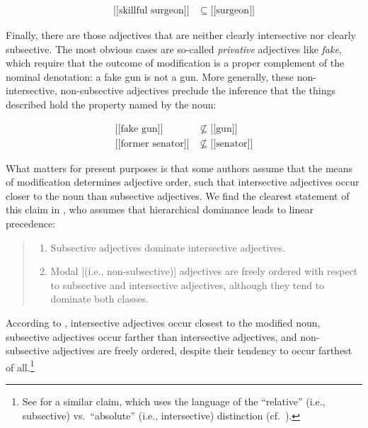 \documentclass[12pt]{article}
\newcommand{\sem}[1]{\mbox{$[\![$#1$]\!]$}}
\newcommand{\ben}{\begin{enumerate}}
\newcommand{\een}{\end{enumerate}}
\begin{document}
\begin{align*} 
\sem{skillful surgeon} & \subseteq \sem{surgeon}
\end{align*}

\noindent Finally, there are those adjectives that are neither clearly intersective nor clearly subsective. The most obvious cases are so-called \emph{privative} adjectives like \emph{fake}, which require that the outcome of modification is a proper complement of the nominal denotation: a fake gun is not a gun.  More generally, these non-intersective, non-subsective adjectives preclude the inference that the things described hold the property named by the noun:

\begin{align*} 
\sem{fake gun} & \nsubseteq \sem{gun}\\
\sem{former senator} & \nsubseteq \sem{senator}
\end{align*}

What matters for present purposes is that some authors assume that the means of modification determines adjective order, such that intersective adjectives occur closer to the noun than subsective adjectives. We find the clearest statement of this claim in \cite{truswell2009}, who assumes that hierarchical dominance leads to linear precedence:

\begin{quotation}
\noindent\ben
	\item Subsective adjectives dominate intersective adjectives. \item Modal [(i.e., non-subsective)] adjectives are freely ordered with respect to subsective and intersective adjectives, although they tend to dominate both classes.
	\een
\end{quotation}

\noindent According to \citeauthor{truswell2009}, intersective adjectives occur closest to the modified noun, subsective adjectives occur farther than intersective adjectives, and non-subsective adjectives are freely ordered, despite their tendency to occur farthest of all.\footnote{See \citet{Sproat1991} for a similar claim, which uses the language of the ``relative'' (i.e., subsective) vs.~``absolute'' (i.e., intersective) distinction (cf.~\citealp{siegel1976}).} 
\end{document}
